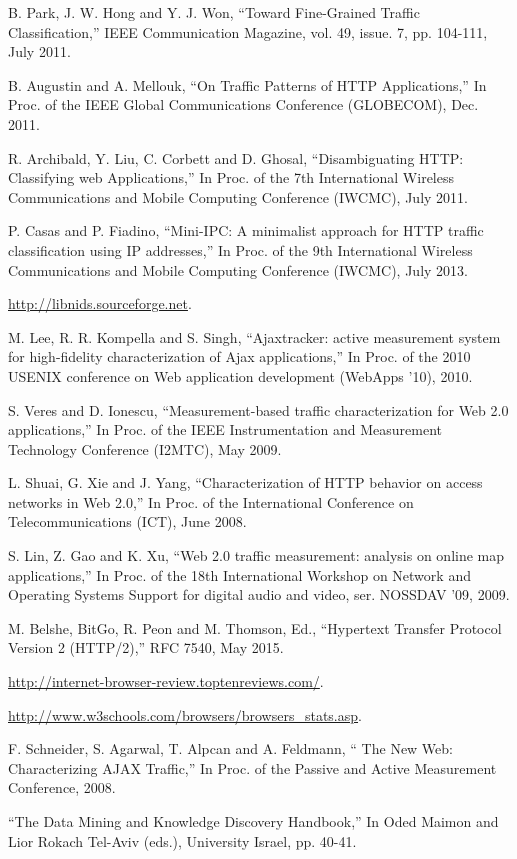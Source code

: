 \begin{thebibliography}{1}
B. Park, J. W. Hong and Y. J. Won,
``Toward Fine-Grained Traffic Classification,'' IEEE Communication Magazine, vol. 49, issue. 7, pp. 104-111, July 2011. 
 
B. Augustin and A. Mellouk,
``On Traffic Patterns of HTTP Applications,'' In Proc. of the IEEE Global Communications Conference (GLOBECOM), Dec. 2011. 
 
R. Archibald, Y. Liu, C. Corbett and D. Ghosal, 
``Disambiguating HTTP: Classifying web Applications,'' In Proc. of the 7th International Wireless Communications and Mobile Computing Conference (IWCMC), July 2011.

P. Casas and P. Fiadino, 
``Mini-IPC: A minimalist approach for HTTP traffic classification using IP addresses,'' In Proc. of the 9th International Wireless Communications and Mobile Computing Conference (IWCMC), July 2013.
 
\url{http://libnids.sourceforge.net}.  

M. Lee, R. R. Kompella and S. Singh, 
``Ajaxtracker: active measurement system for high-fidelity characterization of Ajax applications,'' In Proc. of the 2010 USENIX conference on Web application development (WebApps '10), 2010.  

S. Veres and D. Ionescu, 
``Measurement-based traffic characterization for Web 2.0 applications,'' In Proc. of the IEEE Instrumentation and Measurement Technology Conference (I2MTC), May 2009.
 
L. Shuai, G. Xie and J. Yang,
``Characterization of HTTP behavior on access networks in Web 2.0,'' In Proc. of the International Conference on Telecommunications (ICT), June 2008.

S. Lin, Z. Gao and K. Xu, 
``Web 2.0 traffic measurement: analysis on online map applications,'' In Proc. of the 18th International Workshop on Network and Operating Systems Support for digital audio and video, ser. NOSSDAV ’09, 2009.

M. Belshe, BitGo, R. Peon and M. Thomson, Ed., ``Hypertext Transfer Protocol Version 2 (HTTP/2),'' RFC 7540, May 2015.

\url{http://internet-browser-review.toptenreviews.com/}.

\url{http://www.w3schools.com/browsers/browsers_stats.asp}.

F. Schneider, S. Agarwal, T. Alpcan and A. Feldmann, `` The New Web: Characterizing AJAX Traffic,'' In Proc. of the Passive and Active Measurement Conference, 2008.

``The Data Mining and Knowledge Discovery Handbook,''
In Oded Maimon and Lior Rokach Tel-Aviv (eds.), University Israel, pp. 40-41.

\end{thebibliography}